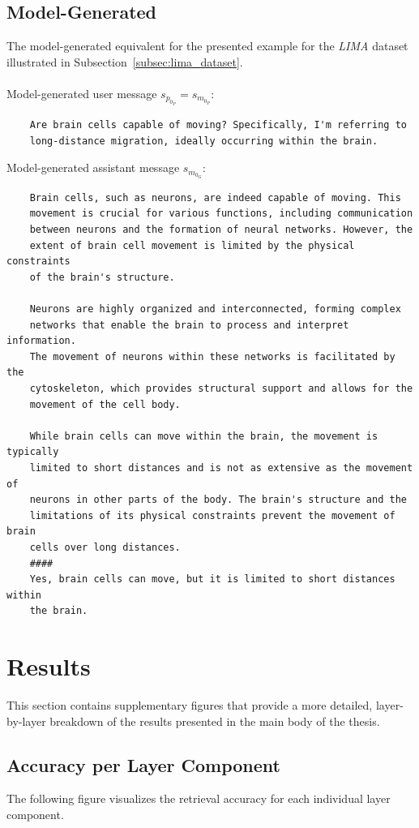 \subsection{Model-Generated}\label{subsec:appendix_model_generated_sample}
The model-generated equivalent for the presented example for the \emph{LIMA} dataset illustrated in Subsection~\ref{subsec:lima_dataset}.
\\\\
Model-generated user message $s_{p_{0_P}} = s_{m_{0_P}}$:
\begin{verbatim}
    Are brain cells capable of moving? Specifically, I'm referring to
    long-distance migration, ideally occurring within the brain.
\end{verbatim}
Model-generated assistant message $s_{m_{0_G}}$:
\begin{verbatim}
    Brain cells, such as neurons, are indeed capable of moving. This 
    movement is crucial for various functions, including communication 
    between neurons and the formation of neural networks. However, the 
    extent of brain cell movement is limited by the physical constraints
    of the brain's structure.

    Neurons are highly organized and interconnected, forming complex 
    networks that enable the brain to process and interpret information.
    The movement of neurons within these networks is facilitated by the 
    cytoskeleton, which provides structural support and allows for the 
    movement of the cell body.
    
    While brain cells can move within the brain, the movement is typically
    limited to short distances and is not as extensive as the movement of 
    neurons in other parts of the body. The brain's structure and the 
    limitations of its physical constraints prevent the movement of brain
    cells over long distances.
    ####
    Yes, brain cells can move, but it is limited to short distances within 
    the brain.
\end{verbatim}

\section{Results}
This section contains supplementary figures that provide a more detailed, layer-by-layer breakdown of the results presented in the main body of the thesis.

\subsection{Accuracy per Layer Component}
The following figure visualizes the retrieval accuracy for each individual layer component.

